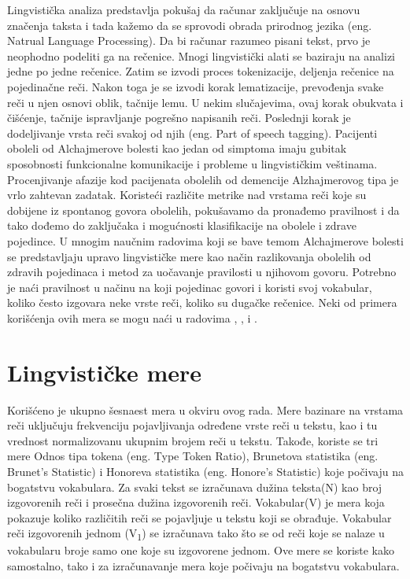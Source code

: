 \documentclass[12pt,oneside]{memoir}
\begin{document}
Lingvistička analiza predstavlja pokušaj da računar zaključuje na osnovu značenja taksta i tada kažemo da se sprovodi obrada prirodnog jezika (eng. Natrual Language Processing).  Da bi računar razumeo pisani tekst,  prvo je neophodno podeliti ga na rečenice.  Mnogi lingvistički alati se baziraju na analizi jedne po jedne rečenice.  Zatim se izvodi proces tokenizacije,  deljenja rečenice na pojedinačne reči.  Nakon toga je se izvodi korak lematizacije,  prevođenja svake reči u njen osnovi oblik, tačnije lemu.  U nekim slučajevima,  ovaj korak obukvata i čišćenje, tačnije ispravljanje pogrešno napisanih reči.  Poslednji korak je dodeljivanje vrsta reči svakoj od njih (eng. Part of speech tagging). 
Pacijenti oboleli od Alchajmerove bolesti kao jedan od simptoma imaju gubitak sposobnosti funkcionalne komunikacije i probleme u lingvističkim veštinama.  Procenjivanje afazije kod pacijenata obolelih od demencije Alzhajmerovog tipa je vrlo zahtevan zadatak.  Koristeći različite metrike nad vrstama reči koje su dobijene iz spontanog govora obolelih,  pokušavamo da pronađemo pravilnost i da tako dođemo do zaključaka i mogućnosti klasifikacije na obolele i zdrave pojedince.  
U mnogim naučnim radovima koji se bave temom Alchajmerove bolesti se predstavljaju upravo lingvističke mere kao način razlikovanja obolelih od zdravih pojedinaca i metod za uočavanje pravilosti u njihovom govoru. Potrebno je naći pravilnost u načinu na koji pojedinac govori i koristi svoj vokabular, koliko često izgovara neke vrste reči,  koliko su dugačke rečenice.  Neki od primera korišćenja ovih mera se mogu naći u radovima , \cite{automaticdetandrat}, \cite{Evaloftechfolexicalperformance} i \cite{linguisticfeatures}.

\section{Lingvističke mere}

Korišćeno je ukupno šesnaest mera u okviru ovog rada.  Mere bazinare na vrstama reči uključuju frekvenciju pojavljivanja određene vrste reči u tekstu, kao i tu vrednost normalizovanu ukupnim brojem reči u tekstu. Takođe,  koriste se tri mere Odnos tipa tokena (eng.  Type Token Ratio),  Brunetova statistika (eng. Brunet's Statistic) i Honoreva statistika (eng.  Honore's Statistic) koje počivaju na bogatstvu vokabulara. 
Za svaki tekst se izračunava dužina teksta(N) kao broj izgovorenih reči i prosečna dužina izgovorenih reči.  Vokabular(V) je mera koja pokazuje koliko različitih reči se pojavljuje u tekstu koji se obrađuje.  Vokabular reči izgovorenih jednom (V\textsubscript{1}) se izračunava tako što se od reči koje se nalaze u vokabularu broje samo one koje su izgovorene jednom.  Ove mere se koriste kako samostalno, tako i za izračunavanje mera koje počivaju na bogatstvu vokabulara. 
\break
\end{document}
